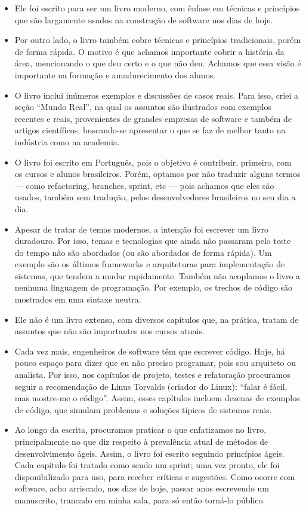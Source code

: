 \documentclass[
  11pt,
  twoside]{book}
\begin{document}
\begin{itemize}
\item
  Ele foi escrito para ser um livro moderno, com ênfase em técnicas e
  princípios que são largamente usados na construção de software nos
  dias de hoje.
\item
  Por outro lado, o livro também cobre técnicas e princípios
  tradicionais, porém de forma rápida. O motivo é que achamos importante
  cobrir a história da área, mencionando o que deu certo e o que não
  deu. Achamos que essa visão é importante na formação e amadurecimento
  dos alunos.
\item
  O livro inclui inúmeros exemplos e discussões de casos reais. Para
  isso, criei a seção ``Mundo Real'', na qual os assuntos são ilustrados
  com exemplos recentes e reais, provenientes de grandes empresas de
  software e também de artigos científicos, buscando-se apresentar o que
  se faz de melhor tanto na indústria como na academia.
\item
  O livro foi escrito em Português, pois o objetivo é contribuir,
  primeiro, com os cursos e alunos brasileiros. Porém, optamos por não
  traduzir alguns termos --- como refactoring, branches, sprint, etc ---
  pois achamos que eles são usados, também sem tradução, pelos
  desenvolvedores brasileiros no seu dia a dia.
\item
  Apesar de tratar de temas modernos, a intenção foi escrever um livro
  duradouro. Por isso, temas e tecnologias que ainda não passaram pelo
  teste do tempo não são abordados (ou são abordados de forma rápida).
  Um exemplo são os últimos frameworks e arquiteturas para implementação
  de sistemas, que tendem a mudar rapidamente. Também não acoplamos o
  livro a nenhuma linguagem de programação. Por exemplo, os trechos de
  código são mostrados em uma sintaxe neutra.
\item
  Ele não é um livro extenso, com diversos capítulos que, na prática,
  tratam de assuntos que não são importantes nos cursos atuais.
\item
  Cada vez mais, engenheiros de software têm que escrever código. Hoje,
  há pouco espaço para dizer que eu não preciso programar, pois sou
  arquiteto ou analista. Por isso, nos capítulos de projeto, testes e
  refatoração procuramos seguir a recomendação de Linus Torvalds
  (criador do Linux): ``falar é fácil, mas mostre-me o código''. Assim,
  esses capítulos incluem dezenas de exemplos de código, que simulam
  problemas e soluções típicos de sistemas reais.
\item
  Ao longo da escrita, procuramos praticar o que enfatizamos no livro,
  principalmente no que diz respeito à prevalência atual de métodos de
  desenvolvimento ágeis. Assim, o livro foi escrito seguindo princípios
  ágeis. Cada capítulo foi tratado como sendo um sprint; uma vez pronto,
  ele foi disponibilizado para uso, para receber críticas e sugestões.
  Como ocorre com software, acho arriscado, nos dias de hoje, passar
  anos escrevendo um manuscrito, trancado em minha sala, para só então
  torná-lo público.
\end{itemize}
\end{document}
